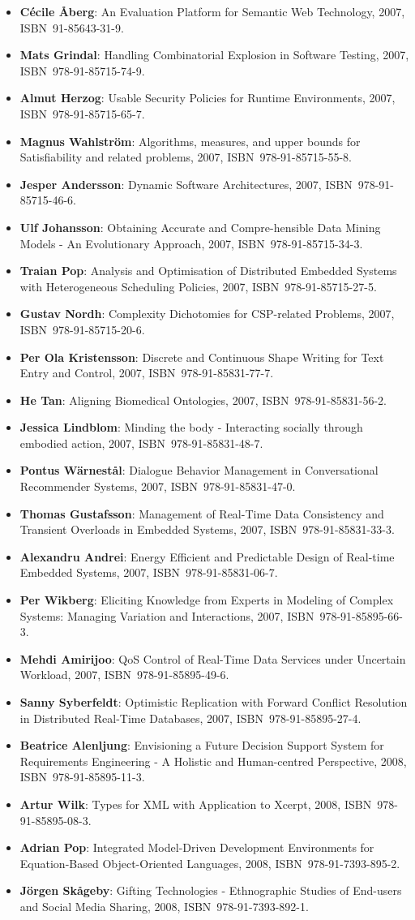 \documentclass[a4paper,showtrims,twocolumn]{memoir}
\newenvironment{theses}{
  \begin{itemize}
    \setlength{\itemsep}{0.2em}
    \setlength{\parskip}{0em}
    \setlength{\parsep}{0em}
}{
  \end{itemize}
}
\newcommand{\thesis}[5]{\item[No.~#1] \textbf{#2}: #3, #4, ISBN~#5.}
\begin{document}
\begin{theses}
    \thesis{1061}{Cécile Åberg}{An Evaluation Platform for Semantic Web Technology}{2007}{91-85643-31-9}
    \thesis{1073}{Mats Grindal}{Handling Combinatorial Explosion in Software Testing}{2007}{978-91-85715-74-9}
    \thesis{1075}{Almut Herzog}{Usable Security Policies for Runtime Environments}{2007}{978-91-85715-65-7}
    \thesis{1079}{Magnus Wahlström}{Algorithms, measures, and upper bounds for Satisfiability and related problems}{2007}{978-91-85715-55-8}
    \thesis{1083}{Jesper Andersson}{Dynamic Software Architectures}{2007}{978-91-85715-46-6}
    \thesis{1086}{Ulf Johansson}{Obtaining Accurate and Compre-hensible Data Mining Models - An Evolutionary Approach}{2007}{978-91-85715-34-3}
    \thesis{1089}{Traian Pop}{Analysis and Optimisation of Distributed Embedded Systems with Heterogeneous Scheduling Policies}{2007}{978-91-85715-27-5}
    \thesis{1091}{Gustav Nordh}{Complexity Dichotomies for CSP-related Problems}{2007}{978-91-85715-20-6}
    \thesis{1106}{Per Ola Kristensson}{Discrete and Continuous Shape Writing for Text Entry and Control}{2007}{978-91-85831-77-7}
    \thesis{1110}{He Tan}{Aligning Biomedical Ontologies}{2007}{978-91-85831-56-2}
    \thesis{1112}{Jessica Lindblom}{Minding the body - Interacting socially through embodied action}{2007}{978-91-85831-48-7}
    \thesis{1113}{Pontus Wärnestål}{Dialogue Behavior Management in Conversational Recommender Systems}{2007}{978-91-85831-47-0}
    \thesis{1120}{Thomas Gustafsson}{Management of Real-Time Data Consistency and Transient Overloads in Embedded Systems}{2007}{978-91-85831-33-3}
    \thesis{1127}{Alexandru Andrei}{Energy Efficient and Predictable Design of Real-time Embedded Systems}{2007}{978-91-85831-06-7}
    \thesis{1139}{Per Wikberg}{Eliciting Knowledge from Experts in Modeling of Complex Systems: Managing Variation and Interactions}{2007}{978-91-85895-66-3}
    \thesis{1143}{Mehdi Amirijoo}{QoS Control of Real-Time Data Services under Uncertain Workload}{2007}{978-91-85895-49-6}
    \thesis{1150}{Sanny Syberfeldt}{Optimistic Replication with Forward Conflict Resolution in Distributed Real-Time Databases}{2007}{978-91-85895-27-4}
    \thesis{1155}{Beatrice Alenljung}{Envisioning a Future Decision Support System for Requirements Engineering - A Holistic and Human-centred Perspective}{2008}{978-91-85895-11-3}
    \thesis{1156}{Artur Wilk}{Types for XML with Application to Xcerpt}{2008}{978-91-85895-08-3}
    \thesis{1183}{Adrian Pop}{Integrated Model-Driven Development Environments for Equation-Based Object-Oriented Languages}{2008}{978-91-7393-895-2}
    \thesis{1185}{Jörgen Skågeby}{Gifting Technologies - Ethnographic Studies of End-users and Social Media Sharing}{2008}{978-91-7393-892-1}

\end{theses}
\end{document}
